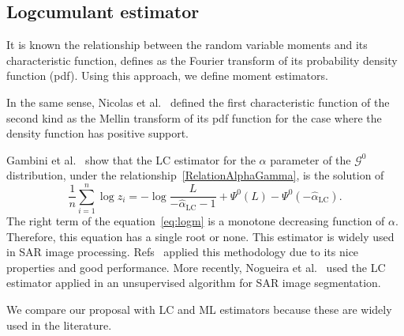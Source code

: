 \documentclass[twocolumn]{svjour3}
\begin{document}

\subsection{Logcumulant estimator}\label{lc}

It is known the relationship between the random variable moments and its characteristic function, defines as the Fourier transform of its probability density function (pdf). 
Using this approach, we define moment estimators. 

In the same sense, Nicolas et al.~\cite{nicolas2002} defined the first characteristic function of the second kind as the Mellin transform of its pdf function for the case where the density function has positive support. 

Gambini et al.~\cite{gambini2015} show that the LC estimator for the $\alpha$ parameter of the $\mathcal{G}^0$ distribution, under the relationship~\eqref{RelationAlphaGamma}, is the solution of 
\begin{equation} \label{eq:logm}
\frac{1}{n} \sum_{i=1}^n\log z_i =   -\log \frac{L}{-\widehat\alpha_{\text{{LC}}}-1} + \Psi^0(L) - \Psi^0(-\widehat\alpha_{\text{{LC}}}).
\end{equation}
The right term of the equation~\eqref{eq:logm} is a monotone decreasing function of $\alpha$. Therefore, this equation has a single root or none. 
This estimator is widely used in SAR image processing. 
Refs~\cite{MellinAnalysisPolSAR,BujorTrouveValetNicolas2004,khan2014} applied this methodology due to its nice properties and good performance. 
More recently, Nogueira et al.~\cite{Nogueira2019} used the LC estimator applied in an unsupervised algorithm for SAR image segmentation.

We compare our proposal with LC and ML estimators because these are widely used in the literature.
\end{document}
